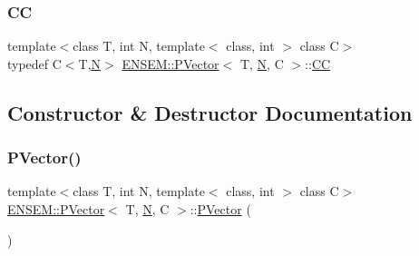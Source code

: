 \mbox{\label{classENSEM_1_1PVector_a92dc0a0a301a3dc96f7be5d337019bc7}} 
\subsubsection{\texorpdfstring{CC}{CC}\hspace{0.1cm}{\footnotesize\ttfamily [3/3]}}
{\footnotesize\ttfamily template$<$class T, int N, template$<$ class, int $>$ class C$>$ \\
typedef C$<$T,\mbox{\hyperlink{adat__devel_2lib_2hadron_2operator__name__util_8cc_a7722c8ecbb62d99aee7ce68b1752f337}{N}}$>$ \mbox{\hyperlink{classENSEM_1_1PVector}{E\+N\+S\+E\+M\+::\+P\+Vector}}$<$ T, \mbox{\hyperlink{adat__devel_2lib_2hadron_2operator__name__util_8cc_a7722c8ecbb62d99aee7ce68b1752f337}{N}}, C $>$\+::\mbox{\hyperlink{classENSEM_1_1PVector_a92dc0a0a301a3dc96f7be5d337019bc7}{CC}}}



\subsection{Constructor \& Destructor Documentation}
\mbox{\label{classENSEM_1_1PVector_afc5f971e6ec88789c8205b2e03b1edfd}} 
\subsubsection{\texorpdfstring{PVector()}{PVector()}\hspace{0.1cm}{\footnotesize\ttfamily [1/3]}}
{\footnotesize\ttfamily template$<$class T, int N, template$<$ class, int $>$ class C$>$ \\
\mbox{\hyperlink{classENSEM_1_1PVector}{E\+N\+S\+E\+M\+::\+P\+Vector}}$<$ T, \mbox{\hyperlink{adat__devel_2lib_2hadron_2operator__name__util_8cc_a7722c8ecbb62d99aee7ce68b1752f337}{N}}, C $>$\+::\mbox{\hyperlink{classENSEM_1_1PVector}{P\+Vector}} (\begin{DoxyParamCaption}{ }\end{DoxyParamCaption})\hspace{0.3cm}{\ttfamily [inline]}}

